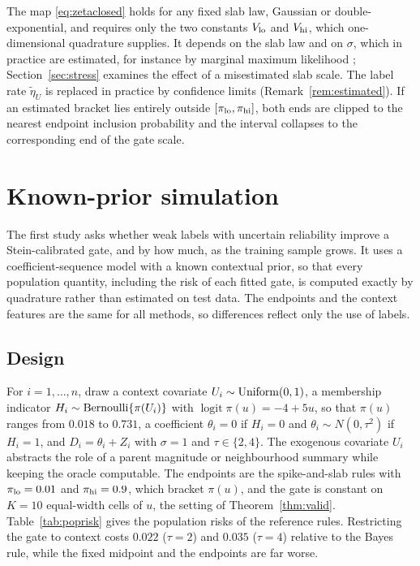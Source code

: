 \documentclass[11pt]{article}
\theoremstyle{plain}
\theoremstyle{definition}
\theoremstyle{remark}
\DeclareMathOperator{\logit}{logit}
\begin{document}
The map \eqref{eq:zetaclosed} holds for any fixed slab law, Gaussian or double-exponential, and
requires only the two constants $V_{\rm lo}$ and $V_{\rm hi}$, which one-dimensional quadrature
supplies. It depends on the slab law and on $\sigma$, which in practice are estimated, for
instance by marginal maximum likelihood \citep{johnstone2005empirical}; Section~\ref{sec:stress}
examines the effect of a misestimated slab scale. The label rate $\widetilde\eta_U$ is replaced
in practice by confidence limits (Remark~\ref{rem:estimated}). If an estimated bracket lies
entirely outside $[\pi_{\rm lo},\pi_{\rm hi}]$, both ends are clipped to the nearest endpoint
inclusion probability and the interval collapses to the corresponding end of the gate scale.

\section{Known-prior simulation}\label{sec:simplan}

The first study asks whether weak labels with uncertain reliability improve a
Stein-calibrated gate, and by how much, as the training sample grows. It uses a
coefficient-sequence model with a known contextual prior, so that every population quantity,
including the risk of each fitted gate, is computed exactly by quadrature rather than estimated
on test data. The endpoints and the context features are the same for all methods, so
differences reflect only the use of labels.

\subsection{Design}

For $i=1,\ldots,n$, draw a context covariate $U_i\sim{\rm Uniform}(0,1)$, a membership
indicator $H_i\sim{\rm Bernoulli}\{\pi(U_i)\}$ with $\logit\pi(u)=-4+5u$, so that $\pi(u)$
ranges from $0.018$ to $0.731$, a coefficient $\theta_i=0$ if $H_i=0$ and
$\theta_i\sim N(0,\tau^2)$ if $H_i=1$, and $D_i=\theta_i+Z_i$ with $\sigma=1$ and
$\tau\in\{2,4\}$. The exogenous covariate $U_i$ abstracts the role of a parent magnitude or
neighbourhood summary while keeping the oracle computable. The endpoints are the
spike-and-slab rules with $\pi_{\rm lo}=0.01$ and $\pi_{\rm hi}=0.9$, which bracket $\pi(u)$,
and the gate is constant on $K=10$ equal-width cells of $u$, the setting of
Theorem~\ref{thm:valid}. Table~\ref{tab:poprisk} gives the population risks of the reference
rules. Restricting the gate to context costs $0.022$ ($\tau=2$) and $0.035$ ($\tau=4$) relative
to the Bayes rule, while the fixed midpoint and the endpoints are far worse.
\end{document}

